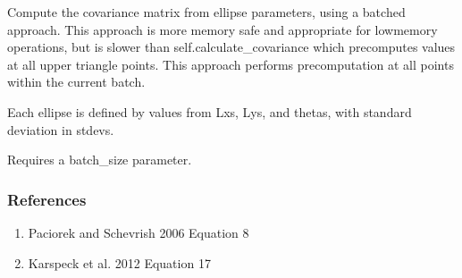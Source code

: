\documentclass[letterpaper,10pt,english]{sphinxmanual}
\begin{document}
\begin{fulllineitems}
\begin{fulllineitems}
\begin{quote}
\begin{description}
\end{description}\end{quote}

\end{fulllineitems}


\begin{fulllineitems}
\label{\detokenize{ellipse:glomar_gridding.ellipse.EllipseCovarianceBuilder.calculate_covariance_batched}}
\pysigstartsignatures
\pysiglinewithargsret
{}
{}
{}
\pysigstopsignatures
\sphinxAtStartPar
Compute the covariance matrix from ellipse parameters, using a batched
approach.
This approach is more memory safe and appropriate for low\sphinxhyphen{}memory
operations, but is slower than self.calculate\_covariance
which pre\sphinxhyphen{}computes values at all upper triangle points. This approach
performs pre\sphinxhyphen{}computation at all points within the current batch.

\sphinxAtStartPar
Each ellipse is defined by values from Lxs, Lys, and thetas, with
standard deviation in stdevs.

\sphinxAtStartPar
Requires a batch\_size parameter.
\begin{quote}\begin{description}
\sphinxAtStartPar
{}

\end{description}\end{quote}
\subsubsection*{References}
\begin{enumerate}
%
\item {}
\sphinxAtStartPar
Paciorek and Schevrish 2006  Equation 8

\item {}
\sphinxAtStartPar
Karspeck et al. 2012  Equation 17

\end{enumerate}


\end{fulllineitems}
\end{fulllineitems}
\end{document}
